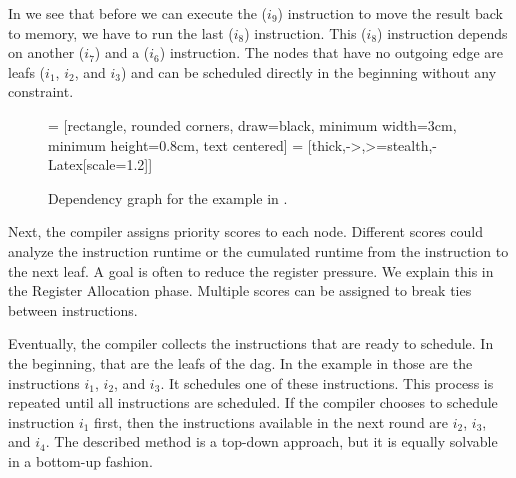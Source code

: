 In  we see that before we can execute the  ($i_9$) instruction to move the result back to memory, we have to run the last  ($i_8$) instruction.
This  ($i_8$) instruction depends on another  ($i_7$) and a  ($i_6$) instruction.
The nodes that have no outgoing edge are leafs ($i_1$, $i_2$, and $i_3$) and can be scheduled directly in the beginning without any constraint.
\begin{figure}
    \centering
     = [rectangle, rounded corners, draw=black, minimum width=3cm, minimum height=0.8cm, text centered]
     = [thick,->,>=stealth,-{Latex[scale=1.2]}]
    \caption[Dependency Graph]{Dependency graph for the example in .}
    \label{fig:bg:example-dag}
\end{figure}

Next, the compiler assigns priority scores to each node.
Different scores could analyze the instruction runtime or the cumulated runtime from the instruction to the next leaf.
A goal is often to reduce the register pressure. 
We explain this in the Register Allocation phase.
Multiple scores can be assigned to break ties between instructions.

Eventually, the compiler collects the instructions that are ready to schedule.
In the beginning, that are the leafs of the \ac{dag}.
In the example in  those are the instructions $i_1$, $i_2$, and $i_3$.
It schedules one of these instructions.
This process is repeated until all instructions are scheduled.
If the compiler chooses to schedule instruction $i_1$ first, then the instructions available in the next round are $i_2$, $i_3$, and $i_4$.
The described method is a top-down approach, but it is equally solvable in a bottom-up fashion.

